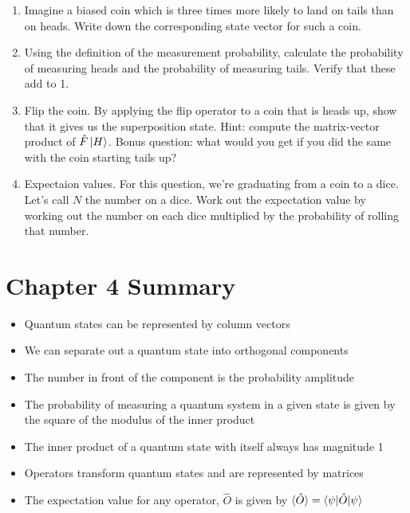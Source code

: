 \begin{enumerate}
    \item Imagine a biased coin which is three times more likely to land on tails than on heads. Write down the corresponding state vector for such a coin.
    \item Using the definition of the measurement probability, calculate the probability of measuring heads and the probability of measuring tails. Verify that these add to 1.
    \item Flip the coin. By applying the flip operator to a coin that is heads up, show that it gives us the superposition state.  
    Hint: compute the matrix-vector product of $\hat{F}\ket{H}$.   
    Bonus question: what would you get if you did the same with the coin starting tails up?  
    \item Expectaion values. For this question, we're graduating from a coin to a dice. Let's call $N$ the number on a dice. Work out the expectation value by working out the number on each dice multiplied by the probability of rolling that number.

\end{enumerate}


\section{Chapter 4 Summary }

\begin{itemize}

    \item Quantum states can be represented by column vectors 
    \item We can separate out a quantum state into orthogonal components 
    \item The number in front of the component is the probability amplitude
    \item The probability of measuring a quantum system in a given state is given by the square of the modulus of the inner product
    \item The inner product of a quantum state with itself always has magnitude 1
    \item Operators transform quantum states and are represented by matrices
    \item The expectation value for any operator, $\hat{O}$  is given by $\braket{\hat{O}} = \braket{\psi|\hat{O}|\psi}$
\end{itemize}